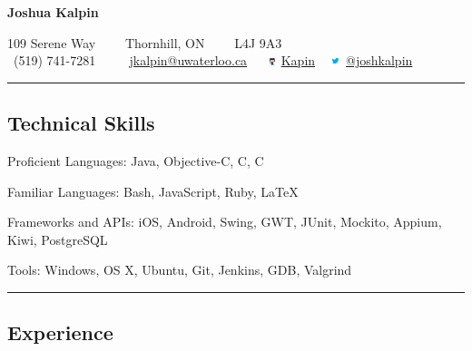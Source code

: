 \documentclass[10pt,letterpaper]{article}
\newenvironment{indentsection}[1]%
{\begin{list}{}%
	{\setlength{\leftmargin}{#1}}%
	\item[]%
}
{\end{list}}
\newcommand{\CPP}
{C\nolinebreak[4]\hspace{-.05em}\raisebox{.22ex}{\footnotesize\bf ++}}
\begin{document}
\begin{center}
{\LARGE \textbf{Joshua Kalpin}}
\vspace{0.1cm}

109 Serene Way\ \ \textbullet
\ \ Thornhill, ON\ \ \textbullet
\ \ L4J 9A3
\\
\Mobilefone \ (519) 741-7281 \ \textbullet
\ \ \Letter \ \href{mailto:jkalpin@uwaterloo.ca}{jkalpin@uwaterloo.ca} \ \textbullet
\ \includegraphics[height=6pt]{Octocat} 
\href{https://github.com/kapin}{Kapin} \ \textbullet
 \includegraphics[height=10pt]{twitter}
\href{https://twitter.com/joshkalpin}{@joshkalpin}
\end{center}

\hrule
\vspace{-0.4em}
\subsection*{Technical Skills}

\begin{indentsection}{\parindent}
\begin{description*}
	\item[Proficient Languages:]
	Java, Objective-C, C, \CPP
	\item[Familiar Languages:]
	Bash, JavaScript, Ruby, \LaTeX
	\item[Frameworks and APIs:]
	iOS, Android, Swing, GWT, JUnit, Mockito, Appium, Kiwi, PostgreSQL
	\item[Tools:]
	Windows, OS X, Ubuntu, Git, Jenkins, GDB, Valgrind
\end{description*}
\end{indentsection}

\hrule
\vspace{-0.4em}
\subsection*{Experience}
\end{document}
